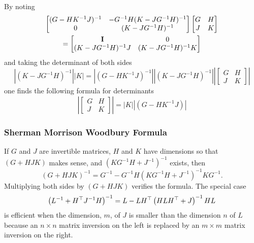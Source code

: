 By noting
\begin{multline*}
  \begin{bmatrix}
    (G-HK^{-1}J)^{-1} & -G^{-1}H(K-JG^{-1}H)^{-1} \\
    0 & (K-JG^{-1}H)^{-1}
  \end{bmatrix}
  \begin{bmatrix}
    G & H \\ J & K
  \end{bmatrix}\\
  =
  \begin{bmatrix}
    {\bf I} & 0 \\
     (K-JG^{-1}H)^{-1}J & (K-JG^{-1}H)^{-1} K
  \end{bmatrix}
\end{multline*}
and taking the determinant of both sides
\renewcommand{\det}[1]{\left| #1 \right|}
\begin{equation*}
  \det{(K-JG^{-1}H)^{-1}} \det{K} = \det{(G-HK^{-1}J)^{-1}}
  \det{(K-JG^{-1}H)^{-1}} \det{
  \begin{bmatrix}
    G & H \\ J & K
  \end{bmatrix}}
\end{equation*}
one finds the following formula for determinants
\begin{equation}
  \label{eq:BlockDet}
  \det{ \begin{bmatrix} G & H \\ J & K \end{bmatrix}} = \det{K}
  \det{(G-HK^{-1}J)}
\end{equation}
\subsubsection{Sherman Morrison Woodbury Formula}

If $G$ and $J$ are invertible matrices, $H$ and $K$ have dimensions so
that $\left( G + HJK \right)$ makes sense, and $\left(KG^{-1}H +
  J^{-1} \right)^{-1}$ exists, then
\begin{equation}
  \label{eq:SMW}
  \left( G + HJK \right)^{-1} = G^{-1} - G^{-1}H\left(KG^{-1}H +
  J^{-1}\right)^{-1}KG^{-1}.
\end{equation}
Multiplying both sides by $\left( G + HJK \right)$ verifies the
formula.  The special case
\begin{equation}
  \label{eq:MatrixInversion}
  \left(L^{-1} + H^\top J^{-1}H \right)^{-1} = L - LH^\top
  \left( HLH^\top + J \right)^{-1}HL
\end{equation}
is efficient when the dimension, $m$, of $J$ is smaller than the
dimension $n$ of $L$ because an $n\times n$ matrix inversion on the
left is replaced by an $m \times m$ matrix inversion on the right.

